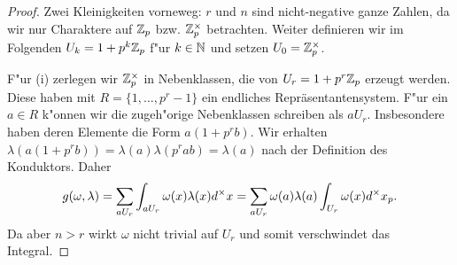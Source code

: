 	\begin{proof}
		Zwei Kleinigkeiten vorneweg: $r$ und $n$ sind nicht-negative ganze Zahlen, da wir nur Charaktere auf ${\mathbb{Z}_p}$ bzw. $\mathbb{Z}_p^\times$ betrachten.
		Weiter definieren wir im Folgenden $U_k=1+p^k{\mathbb{Z}_p}$ f"ur $k\in \mathbb{N}$ und setzen $U_0 = \mathbb{Z}_p^\times$.
		
		F"ur (i) zerlegen wir $\mathbb{Z}_p^\times$ in Nebenklassen, die von $U_r=1+p^r{\mathbb{Z}_p}$ erzeugt werden.
		Diese haben mit $R=\{1,\dots, p^r-1\}$ ein endliches Repräsentantensystem.
		F"ur ein $a \in R$ k"onnen wir die zugeh"orige Nebenklassen schreiben als $aU_r$.
		Insbesondere haben deren Elemente die Form $a(1+p^rb)$. 
		Wir erhalten $\lambda(a(1+p^rb)) = \lambda(a)\lambda(p^rab) = \lambda(a)$ nach der Definition des Konduktors.
		Daher
		\begin{align*}
			g(\omega,\lambda) = \sum_{aU_r}  \int_{aU_r} \omega(x)\lambda(x) d^\times {x} = \sum_{aU_r} \omega(a)\lambda(a) \int_{U_r} \omega(x)d^\times {x}_p.
		\end{align*}
		Da aber $n>r$ wirkt $\omega$ nicht trivial auf $U_r$ und somit verschwindet das Integral.
		

\end{proof}
